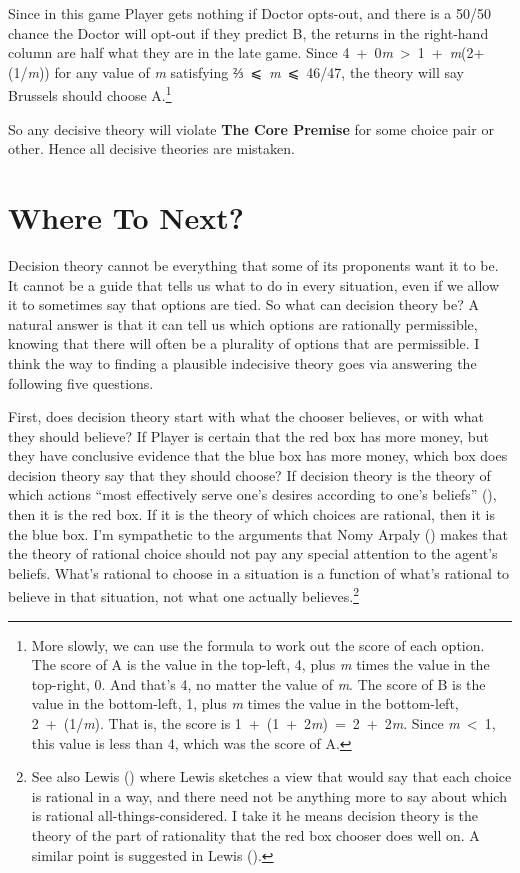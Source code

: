 \documentclass[
  11pt,
  letterpaper,
  DIV=11,
  numbers=noendperiod,
  twoside]{scrartcl}
\begin{document}
Since in this game Player gets nothing if Doctor opts-out, and there is
a 50/50 chance the Doctor will opt-out if they predict B, the returns in
the right-hand column are half what they are in the late game. Since
4~+~0\emph{m}~\textgreater~1~+~\emph{m}(2+(1/\emph{m})) for any value of
\emph{m} satisfying ⅔~⩽~\emph{m}~⩽~46/47, the theory will say Brussels
should choose A.\footnote{More slowly, we can use the formula to work
  out the score of each option. The score of A is the value in the
  top-left, 4, plus \emph{m} times the value in the top-right, 0. And
  that's 4, no matter the value of \emph{m}. The score of B is the value
  in the bottom-left, 1, plus \emph{m} times the value in the
  bottom-left, 2~+~(1/\emph{m}). That is, the score is
  1~+~(1~+~2\emph{m})~=~2~+~2\emph{m}. Since \emph{m}~\textless~1, this
  value is less than 4, which was the score of A.}

So any decisive theory will violate \textbf{The Core Premise} for some
choice pair or other. Hence all decisive theories are mistaken.

\section{Where To Next?}\label{where-to-next}

Decision theory cannot be everything that some of its proponents want it
to be. It cannot be a guide that tells us what to do in every situation,
even if we allow it to sometimes say that options are tied. So what can
decision theory be? A natural answer is that it can tell us which
options are rationally permissible, knowing that there will often be a
plurality of options that are permissible. I think the way to finding a
plausible indecisive theory goes via answering the following five
questions.

First, does decision theory start with what the chooser believes, or
with what they should believe? If Player is certain that the red box has
more money, but they have conclusive evidence that the blue box has more
money, which box does decision theory say that they should choose? If
decision theory is the theory of which actions ``most effectively serve
one's desires according to one's beliefs''
(), then it is the
red box. If it is the theory of which choices are rational, then it is
the blue box. I'm sympathetic to the arguments that Nomy Arpaly
() makes that the theory of rational
choice should not pay any special attention to the agent's beliefs.
What's rational to choose in a situation is a function of what's
rational to believe in that situation, not what one actually
believes.\footnote{See also Lewis
  () where Lewis sketches a
  view that would say that each choice is rational in a way, and there
  need not be anything more to say about which is rational
  all-things-considered. I take it he means decision theory is the
  theory of the part of rationality that the red box chooser does well
  on. A similar point is suggested in Lewis
  ().}
\end{document}
